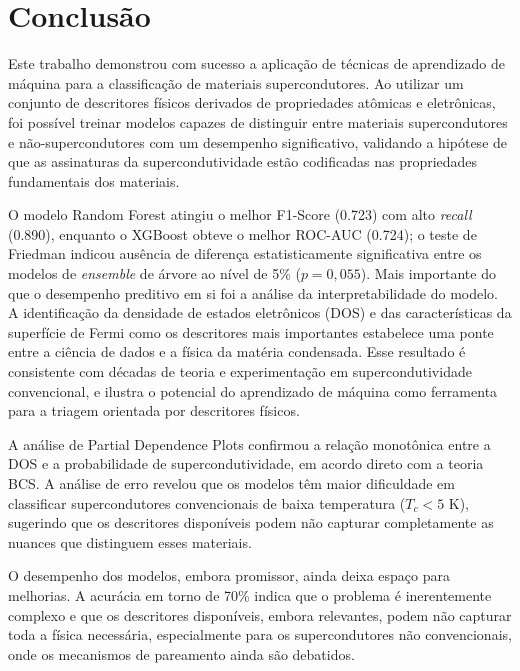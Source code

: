 \documentclass[12pt, a4paper, oneside]{report}
\begin{document}
\chapter{Conclusão}
\label{chap:conclusao}

Este trabalho demonstrou com sucesso a aplicação de técnicas de aprendizado de máquina para a classificação de materiais supercondutores. Ao utilizar um conjunto de descritores físicos derivados de propriedades atômicas e eletrônicas, foi possível treinar modelos capazes de distinguir entre materiais supercondutores e não-supercondutores com um desempenho significativo, validando a hipótese de que as assinaturas da supercondutividade estão codificadas nas propriedades fundamentais dos materiais.

O modelo Random Forest atingiu o melhor F1-Score (0.723) com alto \textit{recall} (0.890), enquanto o XGBoost obteve o melhor ROC-AUC (0.724); o teste de Friedman indicou ausência de diferença estatisticamente significativa entre os modelos de \textit{ensemble} de árvore ao nível de 5\% ($p = 0{,}055$). Mais importante do que o desempenho preditivo em si foi a análise da interpretabilidade do modelo. A identificação da densidade de estados eletrônicos (DOS) e das características da superfície de Fermi como os descritores mais importantes estabelece uma ponte entre a ciência de dados e a física da matéria condensada. Esse resultado é consistente com décadas de teoria e experimentação em supercondutividade convencional, e ilustra o potencial do aprendizado de máquina como ferramenta para a triagem orientada por descritores físicos.

A análise de Partial Dependence Plots confirmou a relação monotônica entre a DOS e a probabilidade de supercondutividade, em acordo direto com a teoria BCS. A análise de erro revelou que os modelos têm maior dificuldade em classificar supercondutores convencionais de baixa temperatura ($T_c < 5$ K), sugerindo que os descritores disponíveis podem não capturar completamente as nuances que distinguem esses materiais.

O desempenho dos modelos, embora promissor, ainda deixa espaço para melhorias. A acurácia em torno de 70\% indica que o problema é inerentemente complexo e que os descritores disponíveis, embora relevantes, podem não capturar toda a física necessária, especialmente para os supercondutores não convencionais, onde os mecanismos de pareamento ainda são debatidos.
\end{document}
